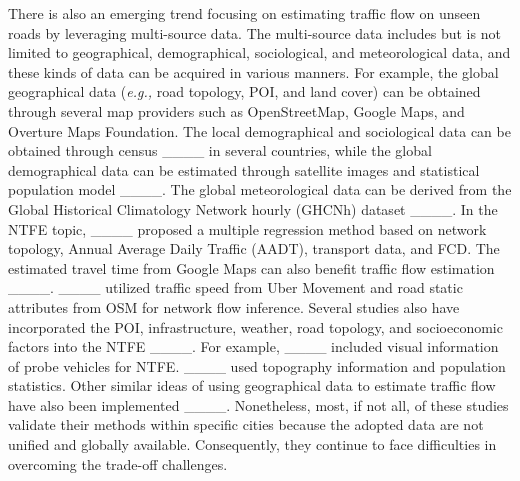 There is also an emerging trend focusing on estimating traffic flow on unseen roads by leveraging multi-source data. The multi-source data includes but is not limited to geographical, demographical, sociological, and meteorological data, and these kinds of data can be acquired in various manners. For example, the global geographical data (\textit{e.g.,} road topology, POI, and land cover) can be obtained through several map providers such as OpenStreetMap, Google Maps, and Overture Maps Foundation. The local demographical and sociological data can be obtained through census ____ in several countries, while the global demographical data can be estimated through satellite images and statistical population model ____. The global meteorological data can be derived from the Global Historical Climatology Network hourly (GHCNh) dataset ____.
In the NTFE topic, ____ proposed a multiple regression method based on network topology, Annual Average Daily Traffic (AADT), transport data, and FCD. The estimated travel time from Google Maps can also benefit traffic flow estimation ____. ____ utilized traffic speed from Uber Movement and road static attributes from OSM for network flow inference. Several studies also have incorporated the POI, infrastructure, weather, road topology, and socioeconomic factors into the NTFE ____. For example, ____ included visual information of probe vehicles for NTFE. ____ used topography information and population statistics. Other similar ideas of using geographical data to estimate traffic flow have also been implemented ____. Nonetheless, most, if not all, of these studies validate their methods within specific cities because the adopted data are not unified and globally available. Consequently, they continue to face difficulties in overcoming the trade-off challenges.